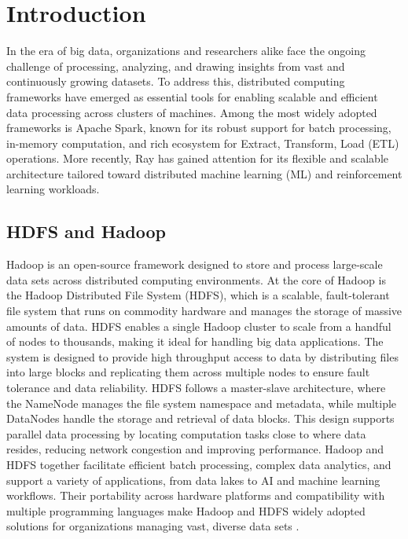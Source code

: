 \documentclass[conference]{IEEEtran}
\begin{document}
\section{Introduction}
In the era of big data, organizations and researchers alike face the ongoing challenge of
processing, analyzing, and drawing insights from vast and continuously growing datasets.
To address this, distributed computing frameworks have emerged as essential tools for
enabling scalable and efficient data processing across clusters of machines. Among the
most widely adopted frameworks is Apache Spark, known for its robust support for batch
processing, in-memory computation, and rich ecosystem for Extract, Transform, Load (ETL)
operations. More recently, Ray has gained attention for its flexible and scalable
architecture tailored toward distributed machine learning (ML) and reinforcement
learning workloads.

\subsection{HDFS and Hadoop}
Hadoop is an open-source framework designed to store and process large-scale data sets across
distributed computing environments. At the core of Hadoop is the Hadoop Distributed File
System (HDFS), which is a scalable, fault-tolerant file system that runs on commodity hardware and
manages the storage of massive amounts of data. HDFS enables a single Hadoop cluster to scale
from a handful of nodes to thousands, making it ideal for handling big data applications.
The system is designed to provide high throughput access to data by distributing files into large
blocks and replicating them across multiple nodes to ensure fault tolerance and data reliability.
HDFS follows a master-slave architecture, where the NameNode manages the file system namespace
and metadata, while multiple DataNodes handle the storage and retrieval of data blocks.
This design supports parallel data processing by locating computation tasks close to where data
resides, reducing network congestion and improving performance. Hadoop and HDFS together
facilitate efficient batch processing, complex data analytics, and support a variety of
applications, from data lakes to AI and machine learning workflows. Their portability across
hardware platforms and compatibility with multiple programming languages make Hadoop and
HDFS widely adopted solutions for organizations managing vast,
diverse data sets \cite{hdfs}.
\end{document}
